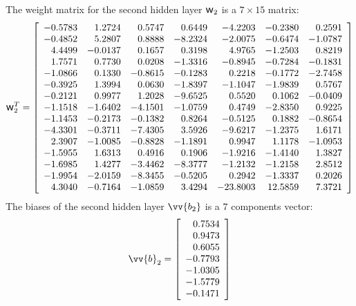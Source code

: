 \documentclass[twoside,english,1p,final,sort&compress]{elsarticle}
\theoremstyle{plain}
\DeclareRobustCommand{\w}{\mbox{\large\ensuremath{\mathsf{w}}}}
\renewcommand{\overrightarrow}{\vv}
\begin{document}
The weight matrix for the second hidden layer $\w_2$ is a $7\times15$ matrix:
\begin{equation*}
\w_2^T = \left[
\begin{array}{rrrrrrr}
-0.5783 & 1.2724 & 0.5747 & 0.6449 & -4.2203 & -0.2380 & 0.2591\\ 
-0.4852 & 5.2807 & 0.8888 & -8.2324 & -2.0075 & -0.6474 & -1.0787\\ 
4.4499 & -0.0137 & 0.1657 & 0.3198 & 4.9765 & -1.2503 & 0.8219\\ 
1.7571 & 0.7730 & 0.0208 & -1.3316 & -0.8945 & -0.7284 & -0.1831\\ 
-1.0866 & 0.1330 & -0.8615 & -0.1283 & 0.2218 & -0.1772 & -2.7458\\ 
-0.3925 & 1.3994 & 0.0630 & -1.8397 & -1.1047 & -1.9839 & 0.5767\\ 
-0.2121 & 0.9977 & 1.2028 & -9.6525 & 0.5520 & 0.1062 & -0.0409\\ 
-1.1518 & -1.6402 & -4.1501 & -1.0759 & 0.4749 & -2.8350 & 0.9225\\ 
-1.1453 & -0.2173 & -0.1382 & 0.8264 & -0.5125 & 0.1882 & -0.8654\\ 
-4.3301 & -0.3711 & -7.4305 & 3.5926 & -9.6217 & -1.2375 & 1.6171\\ 
2.3907 & -1.0085 & -0.8828 & -1.1891 & 0.9947 & 1.1178 & -1.0953\\ 
-1.5955 & 1.6313 & 0.4916 & 0.1906 & -1.9216 & -1.4140 & 1.3827\\ 
-1.6985 & 1.4277 & -3.4462 & -8.3777 & -1.2132 & -1.2158 & 2.8512\\ 
-1.9954 & -2.0159 & -8.3455 & -0.5205 & 0.2942 & -1.3337 & 0.2026\\ 
4.3040 & -0.7164 & -1.0859 & 3.4294 & -23.8003 & 12.5859 & 7.3721\\ 
\end{array}\right]
\end{equation*}
The biases of the second hidden layer $\overrightarrow{b_2}$ is a $7$ components vector:
\begin{equation*}
\overrightarrow{b}_2 = \left[
\begin{array}{r}
0.7534\\ 
0.9473\\ 
0.6055\\ 
-0.7793\\ 
-1.0305\\ 
-1.5779\\ 
-0.1471\\ 
\end{array}\right]
\end{equation*}
\end{document}
